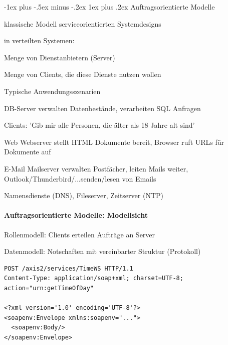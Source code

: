 \documentclass[10pt]{article}
\makeatletter
\renewcommand{\subsubsection}{\@startsection{subsubsection}{3}{0mm}%
                                {-1ex plus -.5ex minus -.2ex}%
                                {1ex plus .2ex}%
                                {\normalfont\small\bfseries}}
\makeatother
\begin{document}
\subsubsection{Auftragsorientierte Modelle}
\begin{itemize*}
  \item klassische Modell serviceorientierten Systemdesigns
  \item in verteilten Systemen:
  \begin{itemize*}
    \item Menge von Dienstanbietern (Server)
    \item Menge von Clients, die diese Dienste nutzen wollen
  \end{itemize*}
\end{itemize*}
Typische Anwendungsszenarien
\begin{description*}
  \item[DB-Server] verwalten Datenbestände, verarbeiten SQL Anfragen
  \begin{itemize*}
    \item Clients: 'Gib mir alle Personen, die älter als 18 Jahre alt sind'
  \end{itemize*}
  \item[Web] Webserver stellt HTML Dokumente bereit, Browser ruft URLs für Dokumente auf
  \item[E-Mail] Mailserver verwalten Postfächer, leiten Mails weiter, Outlook/Thunderbird/...senden/lesen von Emails
  \item[Namensdienste (DNS), Fileserver, Zeitserver (NTP)]
\end{description*}

\paragraph{Auftragsorientierte Modelle: Modellsicht}

\begin{itemize*}
  \item Rollenmodell: Clients erteilen Aufträge an Server
  \item Datenmodell: Notschaften mit vereinbarter Struktur (Protokoll)
\end{itemize*}
\begin{lstlisting}
POST /axis2/services/TimeWS HTTP/1.1
Content-Type: application/soap+xml; charset=UTF-8;
action="urn:getTimeOfDay"

<?xml version='1.0' encoding='UTF-8'?>
<soapenv:Envelope xmlns:soapenv="...">
  <soapenv:Body/>
</soapenv:Envelope>
\end{lstlisting}
\end{document}
